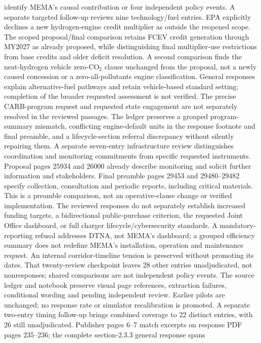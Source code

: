 identify MEMA's causal contribution or four independent policy events.
A separate targeted follow-up reviews nine technology/fuel entries. EPA explicitly
declines a new hydrogen-engine credit multiplier as outside the reopened scope.
The scoped proposal/final comparison retains FCEV credit generation through
MY2027 as already proposed, while distinguishing final multiplier-use restrictions
from base credits and older deficit resolution. A second comparison finds the
neat-hydrogen vehicle zero-CO$_2$ clause unchanged from the proposal, not a newly
caused concession or a zero-all-pollutants engine classification. General responses
explain alternative-fuel pathways and retain vehicle-based standard setting;
completion of the broader requested assessment is not verified. The precise
CARB-program request and requested state engagement are not separately resolved
in the reviewed passages. The ledger preserves a grouped program-summary mismatch,
conflicting engine-default units in the response footnote and final preamble,
and a lifecycle-section referral discrepancy without silently repairing them.
A separate seven-entry infrastructure review distinguishes coordination and
monitoring commitments from specific requested instruments. Proposal pages 25934
and 26000 already describe monitoring and solicit further information and
stakeholders. Final preamble pages 29453 and 29480--29482 specify collection,
consultation and periodic reports, including critical materials. This is a
preamble comparison, not an operative-clause change or verified implementation.
The reviewed responses do not separately establish increased funding targets,
a bidirectional public-purchase criterion, the requested Joint Office dashboard,
or full charger lifecycle/cybersecurity standards. A mandatory-reporting refusal
addresses DTNA, not MEMA's dashboard; a grouped efficiency summary does not
redefine MEMA's installation, operation and maintenance request. An internal
corridor-timeline tension is preserved without promoting its dates.
That twenty-review checkpoint leaves 28 other entries unadjudicated,
not nonresponses; shared comparisons are not independent policy events. The source ledger and
notebook preserve visual page references, extraction failures, conditional wording
and pending independent review. Earlier pilots are unchanged; no response rate
or simulator recalibration is promoted.
A separate two-entry timing follow-up brings combined coverage to 22 distinct
entries, with 26 still unadjudicated. Publisher pages 6--7 match excerpts on
response PDF pages 235--236; the complete section-2.3.3 general response spans
